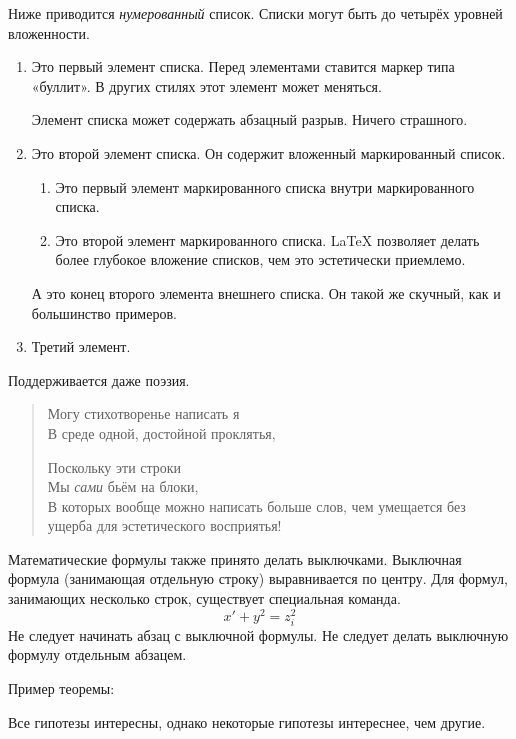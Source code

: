 \documentclass[final,pdftex]{epsilonj}
\numberwithin{equation}{section}
\begin{document}
Ниже приводится \emph{нумерованный} список. Списки могут быть до четырёх уровней вложенности.
\begin{enumerate}
	\item Это первый элемент списка. Перед элементами ставится маркер типа «буллит». В других стилях этот элемент может меняться.
	
	Элемент списка может содержать абзацный разрыв. Ничего страшного.
	\item  Это второй элемент списка. Он содержит вложенный маркированный список. 
	\begin{enumerate}
		\item Это первый элемент маркированного списка внутри маркированного списка. 
		\item Это второй элемент маркированного списка.  \LaTeX{} позволяет делать более глубокое вложение списков, чем это эстетически приемлемо.
	\end{enumerate}
	А это конец второго элемента внешнего списка. Он такой же скучный, как и большинство примеров. 
	\item  Третий элемент.
\end{enumerate}


Поддерживается даже поэзия.
\begin{verse}
   Могу стихотворенье написать я \\         %
   В среде одной, достойной проклятья,   %


   Поскольку эти строки \\
   Мы \emph{сами} бьём на блоки, \\
   В которых вообще можно написать больше слов, чем умещается без ущерба для эстетического восприятья!
\end{verse}

Математические формулы также принято делать выключками. Выключная формула (занимающая отдельную строку) выравнивается по центру. Для формул, занимающих несколько строк, существует специальная команда.
   \[  x' + y^{2} = z_{i}^{2}\]
Не следует начинать абзац с выключной формулы. Не следует делать выключную формулу отдельным абзацем.

Пример теоремы:


\begin{thm}
Все гипотезы интересны, однако некоторые гипотезы интереснее, чем другие. 
\end{thm}
\end{document}
